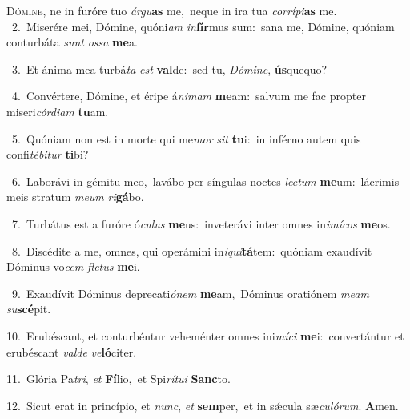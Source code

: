 \lettrine{\initial\textcolor{\initialcolor}{D}}{ómine,} ne in furóre tuo \textit{ár}\-\textit{gu}\textbf{as} me,~\star neque in ira tua \textit{cor}\-\textit{rí}\textit{pi}\textbf{as} me.\\
{\numbfont\textcolor{\numbcolor}{~2.}}~Miserére mei, Dómine, quóni\textit{am} \textit{in}\-\textbf{fír}mus sum:~\star sana me, Dómine, quóniam conturbáta \textit{sunt} \textit{os}\-\textit{sa} \textbf{me}\-a.\par
{\numbfont\textcolor{\numbcolor}{~3.}}~Et ánima mea turbá\textit{ta} \textit{est} \textbf{val}\-de:~\star sed tu, \textit{Dó}\-\textit{mi}\textit{ne}, \textbf{ús}\-quequo?\par
{\numbfont\textcolor{\numbcolor}{~4.}}~Convértere, Dómine, et éripe á\-\textit{ni}\-\textit{mam} \textbf{me}\-am:~\star salvum me fac propter miseri\-\textit{cór}\-\textit{di}\textit{am} \textbf{tu}\-am.\par
{\numbfont\textcolor{\numbcolor}{~5.}}~Quóniam non est in morte qui me\textit{mor} \textit{sit} \textbf{tu}\-i:~\star in inférno autem quis confi\-\textit{té}\-\textit{bi}\textit{tur} \textbf{ti}\-bi?\par
{\numbfont\textcolor{\numbcolor}{~6.}}~Laborávi in gémitu meo,~\dagger lavábo per síngulas noctes \textit{lec}\-\textit{tum} \textbf{me}\-um:~\star lácrimis meis stratum \textit{me}\-\textit{um} \textit{ri}\-\textbf{gá}bo.\par
{\numbfont\textcolor{\numbcolor}{~7.}}~Turbátus est a furóre ó\-\textit{cu}\-\textit{lus} \textbf{me}\-us:~\star inveterávi inter omnes in\-\textit{i}\-\textit{mí}\textit{cos} \textbf{me}\-os.\par
{\numbfont\textcolor{\numbcolor}{~8.}}~Discédite a me, omnes, qui operámini in\-\textit{i}\-\textit{qui}\textbf{tá}tem:~\star quóniam exaudívit Dóminus vo\textit{cem} \textit{fle}\-\textit{tus} \textbf{me}\-i.\par
{\numbfont\textcolor{\numbcolor}{~9.}}~Exaudívit Dóminus deprecati\-\textit{ó}\-\textit{nem} \textbf{me}\-am,~\star Dóminus oratiónem \textit{me}\-\textit{am} \textit{su}\-\textbf{scé}pit.\par
{\numbfont\textcolor{\numbcolor}{10.}}~Erubéscant, et conturbéntur veheménter omnes ini\-\textit{mí}\-\textit{ci} \textbf{me}\-i:~\star convertántur et erubéscant \textit{val}\-\textit{de} \textit{ve}\-\textbf{ló}citer.\par
{\numbfont\textcolor{\numbcolor}{11.}}~Glória Pa\-\textit{tri}\-, \textit{et} \textbf{Fí}\-lio,~\star et Spi\-\textit{rí}\-\textit{tu}\textit{i} \textbf{Sanc}\-to.\par
{\numbfont\textcolor{\numbcolor}{12.}}~Sicut erat in princípio, et \textit{nunc}\-, \textit{et} \textbf{sem}\-per,~\star et in sǽcula sæ\-\textit{cu}\-\textit{ló}\textit{rum}. \textbf{A}\-men.\par
